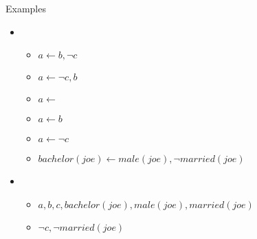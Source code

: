 \begin{frame}{Examples}
  \begin{itemize}
  \item<1-> 
    \begin{itemize}
    \item<1-> $a \leftarrow b, \neg c$
      \smallskip
    \item<1-> $a \leftarrow \neg c, b$
      \medskip
    \item<2-> $a \leftarrow           $
    \item<2-> $a \leftarrow b         $
    \item<2-> $a \leftarrow    \neg c$
      \medskip
    \item<3-> $\mathit{bachelor}(\mathit{joe}) \leftarrow \mathit{male}(\mathit{joe}), \neg \mathit{married}(\mathit{joe})$
    \end{itemize}
    \bigskip
  \item<4-> 
    \begin{itemize}
    \item<4-> $a,b,c,\mathit{bachelor}(\mathit{joe}), \mathit{male}(\mathit{joe}),\mathit{married}(\mathit{joe})$
      \smallskip
    \item<4-> $\neg c, \neg \mathit{married}(\mathit{joe})$
    \end{itemize}
  \end{itemize}
\end{frame}
%
